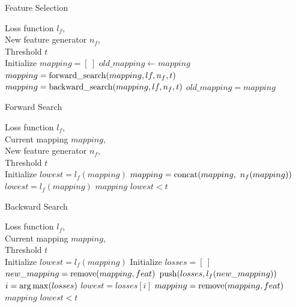 \documentclass{article}
\begin{document}
\begin{algorithm}[tb]
   \caption{Feature Selection}
   \label{alg:featureselection}
\begin{algorithmic}
    Loss function $l_f$, \\
   \quad \quad \quad New feature generator $n_f$, \\
   \quad \quad \quad Threshold $t$ \\
   \STATE Initialize $mapping = [ \ ]$
   \REPEAT
   \STATE $old\_mapping \gets mapping$
   \STATE $mapping = {\rm forward\_search}(mapping, lf, n_f, t)$
   \STATE $mapping = {\rm backward\_search}(mapping, lf, n_f, t)$
   \UNTIL $old\_mapping = mapping$
\end{algorithmic}
\end{algorithm}

\begin{algorithm}[tb]
   \caption{Forward Search}
   \label{alg:forwardsearch}
\begin{algorithmic}
    Loss function $l_f$, \\
   \quad \quad \quad Current mapping $mapping$, \\
   \quad \quad \quad New feature generator $n_f$, \\
   \quad \quad \quad Threshold $t$ \\
   \STATE Initialize $lowest = l_f(mapping)$
   \REPEAT
   \STATE $mapping = {\rm concat}(mapping, \ n_f(mapping))$
   \STATE $lowest = l_f(mapping)$
   \ELSE
    $mapping$
   \ENDIF
   \UNTIL $lowest < t$
\end{algorithmic}
\end{algorithm}

\begin{algorithm}[tb]
   \caption{Backward Search}
   \label{alg:backwardsearch}
\begin{algorithmic}
    Loss function $l_f$, \\
   \quad \quad \quad Current mapping $mapping$, \\
   \quad \quad \quad Threshold $t$ \\
   \STATE Initialize $lowest = l_f(mapping)$
   \REPEAT
   \STATE Initialize $losses = [ \ ]$
   \STATE $new\_mapping = {\rm remove}(mapping, feat)$
   \STATE ${\rm push}(losses, l_f(new\_mapping))$
   \ENDFOR
   \STATE $i = {\rm arg\,max}(losses)$
   \STATE $lowest = losses[i]$
   \STATE $mapping = {\rm remove}(mapping, feat)$
   \ELSE
    $mapping$
   \ENDIF
   \UNTIL $lowest < t$
\end{algorithmic}
\end{algorithm}
\end{document}
